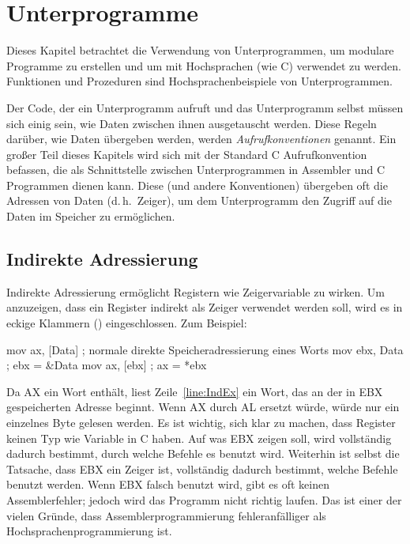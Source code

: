 \chapter{Unterprogramme}

Dieses Kapitel betrachtet die Verwendung von Unterprogrammen, um
modulare Programme zu erstellen und um mit Hochsprachen (wie C)
verwendet zu werden. Funktionen und Prozeduren sind
Hochsprachenbeispiele von Unterprogrammen.

Der Code, der ein Unterprogramm aufruft und das Unterprogramm selbst
m\"{u}ssen sich einig sein, wie Daten zwischen ihnen ausgetauscht
werden. Diese Regeln dar\"{u}ber, wie Daten \"{u}bergeben werden, werden
\emph{Aufrufkonventionen}  genannt. Ein
gro{\ss}er Teil dieses Kapitels wird sich mit der Standard C
Aufrufkonvention befassen, die als Schnittstelle zwischen
Unterprogrammen in Assembler und C Programmen dienen kann. Diese
(und andere Konventionen) \"{u}bergeben oft die Adressen von Daten
(d.\,h.\ Zeiger), um dem Unterprogramm den Zugriff auf
die Daten im Speicher zu erm\"{o}glichen.

\section{Indirekte Adressierung}

Indirekte Adressierung erm\"{o}glicht Registern wie Zeigervariable zu
wirken. Um anzuzeigen, dass ein Register indirekt als Zeiger
verwendet werden soll, wird es in eckige Klammern ({\code [\,]})
eingeschlossen. Zum Beispiel:
\begin{AsmCodeListing}[frame=none, numbers=left, commandchars=\\\{\}]
      mov    ax, [Data]     ; normale direkte Speicheradressierung eines Worts
      mov    ebx, Data      ; ebx = &Data
      mov    ax, [ebx]      ; ax = *ebx     \label{line:IndEx}
\end{AsmCodeListing}
Da AX ein Wort enth\"{a}lt, liest Zeile~\ref{line:IndEx} ein Wort, das
an der in EBX gespeicherten Adresse beginnt. Wenn AX durch AL
ersetzt w\"{u}rde, w\"{u}rde nur ein einzelnes Byte gelesen werden. Es ist
wichtig, sich klar zu machen, dass Register keinen Typ wie Variable
in C haben. Auf was EBX zeigen soll, wird vollst\"{a}ndig dadurch
bestimmt, durch welche Befehle es benutzt wird. Weiterhin ist selbst
die Tatsache, dass EBX ein Zeiger ist, vollst\"{a}ndig dadurch bestimmt,
welche Befehle benutzt werden. Wenn EBX falsch benutzt wird, gibt es
oft keinen Assemblerfehler; jedoch wird das Programm nicht richtig
laufen. Das ist einer der vielen Gr\"{u}nde, dass
Assemblerprogrammierung fehleranf\"{a}lliger als
Hochsprachenprogrammierung ist.

